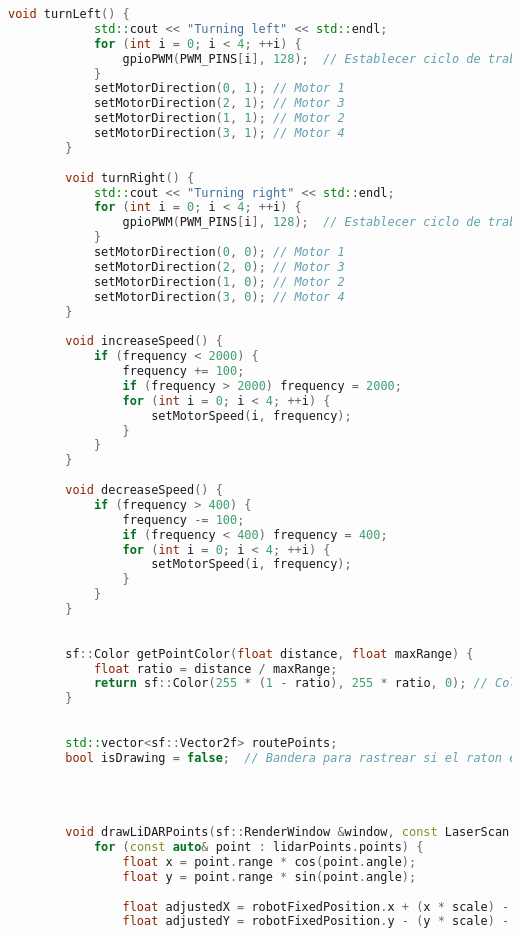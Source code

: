 \begin{lstlisting}[language={C++}, caption={Primer ajuste de c\'odigo}, label={Script}]
        void turnLeft() {
            std::cout << "Turning left" << std::endl;
            for (int i = 0; i < 4; ++i) {
                gpioPWM(PWM_PINS[i], 128);  // Establecer ciclo de trabajo al 50%
            }
            setMotorDirection(0, 1); // Motor 1
            setMotorDirection(2, 1); // Motor 3
            setMotorDirection(1, 1); // Motor 2
            setMotorDirection(3, 1); // Motor 4
        }
        
        void turnRight() {
            std::cout << "Turning right" << std::endl;
            for (int i = 0; i < 4; ++i) {
                gpioPWM(PWM_PINS[i], 128);  // Establecer ciclo de trabajo al 50%
            }
            setMotorDirection(0, 0); // Motor 1
            setMotorDirection(2, 0); // Motor 3
            setMotorDirection(1, 0); // Motor 2
            setMotorDirection(3, 0); // Motor 4
        }
        
        void increaseSpeed() {
            if (frequency < 2000) {
                frequency += 100;
                if (frequency > 2000) frequency = 2000;
                for (int i = 0; i < 4; ++i) {
                    setMotorSpeed(i, frequency);
                }
            }
        }
        
        void decreaseSpeed() {
            if (frequency > 400) {
                frequency -= 100;
                if (frequency < 400) frequency = 400;
                for (int i = 0; i < 4; ++i) {
                    setMotorSpeed(i, frequency);
                }
            }
        }
        
        
        sf::Color getPointColor(float distance, float maxRange) {
            float ratio = distance / maxRange;
            return sf::Color(255 * (1 - ratio), 255 * ratio, 0); // Color de rojo a verde
        }
        
        
        std::vector<sf::Vector2f> routePoints;
        bool isDrawing = false;  // Bandera para rastrear si el raton esta presionado
        
        
        
        
        void drawLiDARPoints(sf::RenderWindow &window, const LaserScan &lidarPoints, const sf::Vector2f &robotPosition, float scale, float max_range) {
            for (const auto& point : lidarPoints.points) {
                float x = point.range * cos(point.angle);
                float y = point.range * sin(point.angle);
        
                float adjustedX = robotFixedPosition.x + (x * scale) - robotPosition.x;
                float adjustedY = robotFixedPosition.y - (y * scale) - robotPosition.y;  // Invertir Y para la pantalla
        

\end{lstlisting}

